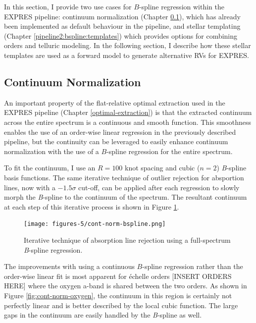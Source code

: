In this section, I provide two use cases for $B$-spline regression within the EXPRES pipeline: continuum normalization (Chapter \ref{pipeline2:bspline:cont-norm}), which has already been implemented as default behaviour in the pipeline, and stellar templating (Chapter \ref{pipeline2:bspline:templates}) which provides options for combining orders and telluric modeling. In the following section, I describe how these stellar templates are used as a forward model to generate alternative RVs for EXPRES.

\subsection{Continuum Normalization} \label{pipeline2:bspline:cont-norm}

An important property of the flat-relative optimal extraction used in the EXPRES pipeline (Chapter \ref{optimal-extraction}) is that the extracted continuum across the entire spectrum is a continuous and smooth function. This smoothness enables the use of an order-wise linear regression in the previously described pipeline, but the continuity can be leveraged to easily enhance continuum normalization with the use of a $B$-spline regression for the entire spectrum.

To fit the continuum, I use an $R=100$ knot spacing and cubic ($n=2$) \textit{B}-spline basis functions. The same iterative technique of outlier rejection for absportion lines, now with a $-1.5\sigma$ cut-off, can be applied after each regression to slowly morph the \textit{B}-spline to the continuum of the spectrum. The resultant continuum at each step of this iterative process is shown in Figure \ref{fig:cont-norm-bspline}.

\begin{figure}[H]
    \centering
    \texttt{[image: figures-5/cont-norm-bspline.png]}
    \caption{Iterative technique of absorption line rejection using a full-spectrum \textit{B}-spline regression. }
    \label{fig:cont-norm-bspline}
\end{figure}

The improvements with using a continuous $B$-spline regression rather than the order-wise linear fit is most apparent for \'{e}chelle orders [INSERT ORDERS HERE] where the oxygen a-band is shared between the two orders. As shown in Figure \ref{fig:cont-norm-oxygen}, the continuum in this region is certainly not perfectly linear and is better described by the local cubic function. The large gaps in the continuum are easily handled by the \textit{B}-spline as well.


